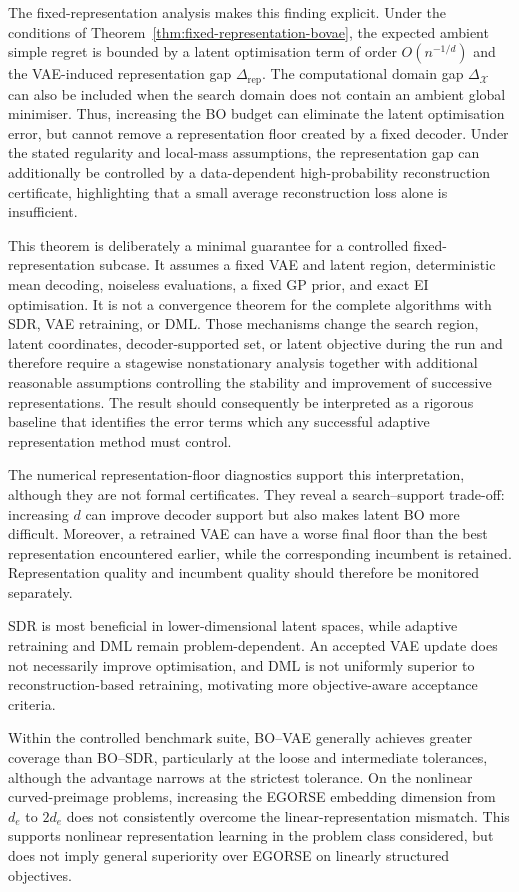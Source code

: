 \documentclass[pdflatex,sn-mathphys-num]{sn-jnl}%
\theoremstyle{thmstyleone}%
\theoremstyle{thmstyletwo}%
\theoremstyle{thmstylethree}%
\begin{document}
The fixed-representation analysis makes this finding explicit. Under the conditions of Theorem~\ref{thm:fixed-representation-bovae}, the expected ambient simple regret is bounded by a latent optimisation term of order $O(n^{-1/d})$ and the VAE-induced representation gap $\Delta_{\mathrm{rep}}$. The computational domain gap $\Delta_{\mathcal{X}}$ can also be included when the search domain does not contain an ambient global minimiser. Thus, increasing the BO budget can eliminate the latent optimisation error, but cannot remove a representation floor created by a fixed decoder. Under the stated regularity and local-mass assumptions, the representation gap can additionally be controlled by a data-dependent high-probability reconstruction certificate, highlighting that a small average reconstruction loss alone is insufficient. 

This theorem is deliberately a minimal guarantee for a controlled fixed-representation subcase. It assumes a fixed VAE and latent region, deterministic mean decoding, noiseless evaluations, a fixed GP prior, and exact EI optimisation. It is not a convergence theorem for the complete algorithms with SDR, VAE retraining, or DML. Those mechanisms change the search region, latent coordinates, decoder-supported set, or latent objective during the run and therefore require a stagewise nonstationary analysis together with additional reasonable assumptions controlling the stability and improvement of successive representations. The result should consequently be interpreted as a rigorous baseline that identifies the error terms which any successful adaptive representation method must control. 

The numerical representation-floor diagnostics support this interpretation, although they are not formal certificates. They reveal a search--support
trade-off: increasing \(d\) can improve decoder support but also makes latent BO more difficult. Moreover, a retrained VAE can have a worse final floor than the best representation encountered earlier, while the corresponding incumbent is retained. Representation quality and incumbent quality should therefore be monitored separately.

SDR is most beneficial in lower-dimensional latent spaces, while adaptive retraining and DML remain problem-dependent. An accepted VAE update does not necessarily improve optimisation, and DML is not uniformly superior to reconstruction-based retraining, motivating more objective-aware acceptance criteria.

Within the controlled benchmark suite, BO--VAE generally achieves greater coverage than BO--SDR, particularly at the loose and intermediate tolerances, although the advantage narrows at the strictest tolerance. On the nonlinear curved-preimage problems, increasing the EGORSE embedding dimension from \(d_e\) to \(2d_e\) does not consistently overcome the linear-representation mismatch. This supports nonlinear representation learning in the problem class considered, but does not imply general superiority over EGORSE on linearly structured objectives.
\end{document}
